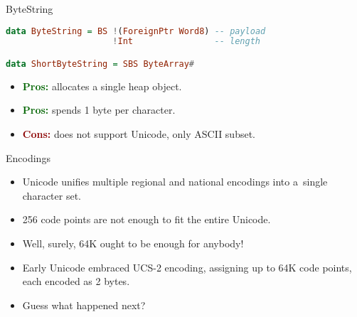 \documentclass[handout]{beamer}
\def\pros{\textcolor{darkgreen}{\bf Pros:} }
\def\cons{\textcolor{darkred}{\bf Cons:}\! }
\begin{document}
\begin{frame}[fragile]{ByteString}

\begin{lstlisting}[language=Haskell]
data ByteString = BS !(ForeignPtr Word8) -- payload
                     !Int                -- length

data ShortByteString = SBS ByteArray#
\end{lstlisting}

\begin{itemize}
\item \pros allocates a single heap object.
\item \pros spends 1 byte per character.
\item \cons does not support Unicode, only ASCII subset.
\end{itemize}

\bigskip
\bigskip

\pause

\begin{itemize}
\whatisascii
\end{itemize}

\end{frame}

\begin{frame}[fragile]{Encodings}

\begin{itemize}
\whatisascii
\pause
\item Unicode unifies multiple regional and national
      encodings into a~single character set.
\pause
\item 256 code points are not enough to fit the entire Unicode.
\pause
\item Well, surely, 64K ought to be enough for anybody!
\pause
\item Early Unicode embraced UCS-2 encoding, assigning up to 64K
      code points, each encoded as 2 bytes.
\pause
\item Guess what happened next?

\end{itemize}

\end{frame}
\end{document}

